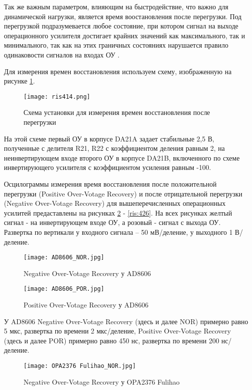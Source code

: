 Так же важным параметром, влияющим на быстродействие, что важно для динамической нагрузки, является 
время воостановления после перегрузки. Под перегрузкой подразумевается  любое состояние, при котором 
сигнал на выходе операционного усилителя достигает крайних значений как максимального, так и минимального,
так как на этих граничных состояниях нарушается правило одинаковости сигналов на входах ОУ \cite{Chopper:OU}.

Для измерения времен восстановления используем схему, изображенную на рисунке \ref{ris:414}.

\begin{figure}[H]
\centering
\texttt{[image: ris414.png]}
\caption{Схема установки для измерения времен восстановления после перегрузки}
\label{ris:414}
\end{figure}

На этой схеме первый ОУ в корпусе DA21A задает стабильные 2,5 В, полученные с делителя R21, R22 с 
коэффициентом деления равным 2, на неинвертирующем входе второго ОУ в корпусе DA21B, включенного по схеме
инвертирующего усилителя с коэффициентом усиления равным -100. 


Осцилограммы измерения время восстановления после положительной перегрузки (Positive Over-Votage Recovery) 
и после отрицательной перегрузки (Negative Over-Votage Recovery) для вышеперечисленных операционных усилитей
предаставлены на рисунках \ref{ris:415} - \ref{ris:426}. На всех рисунках желтый сигнал - на инвертирующем 
входе ОУ, а розовый - сигнал с выхода ОУ. Развертка по вертикали у входного сигнала -- 50 мВ/деление, 
у выходного 1 В/деление. 

\begin{figure}[H]
\centering
\texttt{[image: AD8606\_NOR.jpg]}
\caption{Negative Over-Votage Recovery у AD8606}
\label{ris:415}
\end{figure}

\begin{figure}[H]
\centering
\texttt{[image: AD8606\_POR.jpg]}
\caption{Positive Over-Votage Recovery у AD8606}
\label{ris:416}
\end{figure}

У AD8606 Negative Over-Votage Recovery (здесь и далее NOR) примерно равно 5 мкс, развертка по времени 
2 мкс/деление, Positive Over-Votage Recovery (здесь и далее POR) примерно равно 450 нс, развертка по времени 
200 нс/деление.

\begin{figure}[H]
\centering
\texttt{[image: OPA2376 Fulihao\_NOR.jpg]}
\caption{Negative Over-Votage Recovery у OPA2376 Fulihao}
\label{ris:417}
\end{figure}

